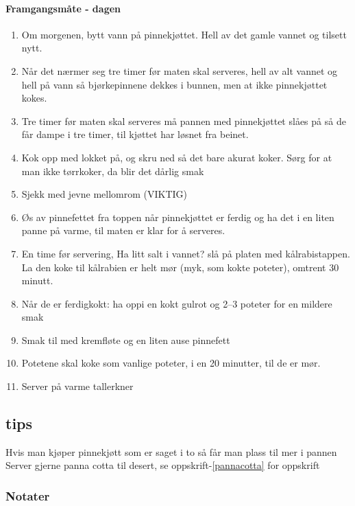 \paragraph{Framgangsmåte - dagen}
\begin{enumerate}[noitemsep]
	\item Om morgenen, bytt vann på pinnekjøttet. Hell av det gamle vannet og tilsett nytt.
	\item Når det nærmer seg tre timer før maten skal serveres, hell av alt vannet og hell på vann så bjørkepinnene dekkes i bunnen, men at ikke pinnekjøttet kokes.
	\item Tre timer før maten skal serveres må pannen med pinnekjøttet slåes på så de får dampe i tre timer, til kjøttet har løsnet fra beinet.
	\item Kok opp med lokket på, og skru ned så det bare akurat koker. Sørg for at man ikke tørrkoker, da blir det dårlig smak
	\item Sjekk med jevne mellomrom (VIKTIG)
	\item Øs av pinnefettet fra toppen når pinnekjøttet er ferdig og ha det i en liten panne på varme, til maten er klar for å serveres.

	\item En time før servering, Ha litt salt i vannet?  slå på platen med kålrabistappen. La den koke til kålrabien er helt mør (myk, som kokte poteter), omtrent 30 minutt.
	\item Når de er ferdigkokt: ha oppi en kokt gulrot og 2--3 poteter for en mildere smak
	\item Smak til med kremfløte og en liten ause pinnefett

	\item Potetene skal koke som vanlige poteter, i en 20 minutter, til de er mør.

	\item Server på varme tallerkner
\end{enumerate}

\subsection{tips}
Hvis man kjøper pinnekjøtt som er saget i to så får man plass til mer i pannen
Server gjerne panna cotta til desert, se oppskrift-\ref{pannacotta} for oppskrift

\subsubsection{Notater}

